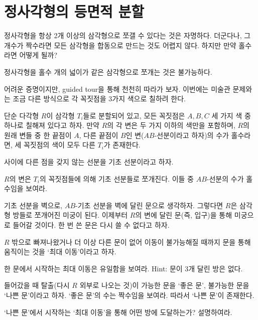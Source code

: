 \section{정사각형의 등면적 분할}
정사각형을 항상 2개 이상의 삼각형으로 쪼갤 수 있다는 것은 자명하다. 더군다나, 그 개수가 짝수라면 모든 삼각형을 합동으로 만드는 것도 어렵지 않다. 하지만 만약 홀수라면 어떻게 될까?
\begin{theorem}
    정사각형을 홀수 개의 넓이가 같은 삼각형으로 쪼개는 것은 불가능하다.
\end{theorem}
어려운 증명이지만, guided tour을 통해 천천히 따라가 보자. 이번에는 미술관 문제와는 조금 다른 방식으로 각 꼭짓점을 3가지 색으로 칠하려 한다. 
\begin{lemma}
단순 다각형 $R$이 삼각형 $T_i$들로 분할되어 있고, 모든 꼭짓점은 $A, B, C$ 세 가지 색 중 하나로 칠해져 있다고 하자. 만약 $R$의 각 변은 두 가지 이하의 색만을 포함하며, $R$의 원래 변들 중 한 끝점이 $A$, 다른 끝점이 $B$인 변($AB$-선분이라고 하자)의 수가 홀수라면, 세 꼭짓점의 색이 모두 다른 $T_i$가 존재한다. 
\end{lemma}
\begin{definition}
사이에 다른 점을 갖지 않는 선분을 기초 선분이라고 하자. 
\end{definition}
\begin{exercise}
    $R$의 변은 $T_i$의 꼭짓점들에 의해 기초 선분들로 쪼개진다. 이들 중 $AB$-선분의 수가 홀수임을 보여라. 
\end{exercise}
기초 선분을 벽으로, $AB$-기초 선분을 벽에 달린 문으로 생각하자. 그렇다면 $R$은 삼각형 방들로 쪼개어진 미궁이 된다. 이제부터 $R$의 변에 달린 문(즉, 입구)을 통해 미궁으로 들어갈 것이다. 한 번 쓴 문은 다시 쓸 수 없다고 하자.  
\begin{definition}
    $R$ 밖으로 빠져나왔거나 더 이상 다른 문이 없어 이동이 불가능해질 때까지 문을 통해 움직이는 것을 `최대 이동'이라고 하자. 
\end{definition}
\begin{exercise}
    한 문에서 시작하는 최대 이동은 유일함을 보여라. Hint: 문이 3개 달린 방은 없다. 
\end{exercise}
\begin{exercise}
    들어갔을 때 탈출(다시 $R$ 외부로 나오는 것)이 가능한 문을 `좋은 문', 불가능한 문을 `나쁜 문'이라고 하자. `좋은 문'의 수는 짝수임을 보여라. 따라서 `나쁜 문'이 존재한다. 
\end{exercise}
\begin{exercise}
    `나쁜 문'에서 시작하는 `최대 이동'을 통해 어떤 방에 도달하는가? 설명하여라. 
\end{exercise}

